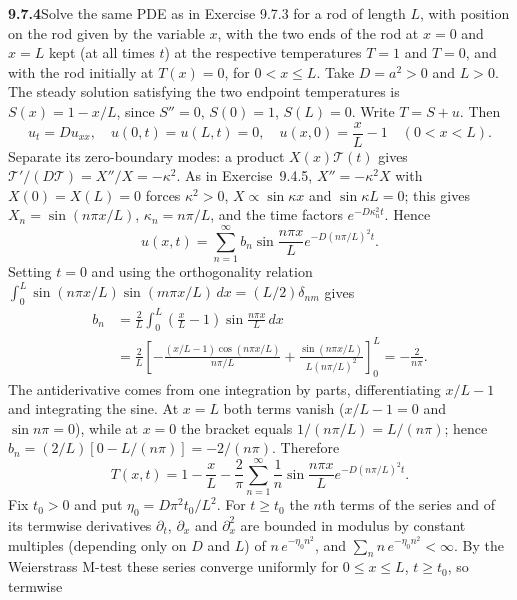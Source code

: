 \par\bigskip
\noindent\textbf{9.7.4}\quad Solve the same PDE as in Exercise 9.7.3 for a rod
of length $L$, 
with position on the rod given by the variable $x$, with the
two ends of the rod at $x=0$ and $x=L$ kept (at all times $t$) at the
respective temperatures $T=1$ and $T=0$, and with the rod initially at
$T(x)=0$, for $0<x\le L$.
\solution
Take $D=a^2>0$ and $L>0$.
The steady solution satisfying the two endpoint temperatures is
$S(x)=1-x/L$, since $S''=0$, $S(0)=1$, $S(L)=0$.
Write $T=S+u$.  Then
\[
u_t=D u_{xx},\quad u(0,t)=u(L,t)=0,\quad
u(x,0)=\frac xL-1\quad(0<x<L).
\]
Separate its zero-boundary modes: a product $X(x)\mathcal T(t)$ gives
$\mathcal T'/(D\mathcal T)=X''/X=-\kappa^2$.  As in Exercise~9.4.5,
$X''=-\kappa^2X$ with $X(0)=X(L)=0$ forces $\kappa^2>0$,
$X\propto\sin\kappa x$ and $\sin\kappa L=0$; this gives
$X_n=\sin(n\pi x/L)$, $\kappa_n=n\pi/L$, and the time factors
$e^{-D\kappa_n^2t}$.
Hence
\[
u(x,t)=\sum_{n=1}^{\infty}b_n\sin\frac{n\pi x}{L}
 e^{-D(n\pi/L)^2t}.
\]
Setting $t=0$ and using the orthogonality relation
$\int_0^L\sin(n\pi x/L)\sin(m\pi x/L)\,dx=(L/2)\delta_{nm}$ gives
\begin{align*}
b_n&=\frac2L\int_0^L\left(\frac xL-1\right)
                  \sin\frac{n\pi x}L\,dx\\
&=\frac2L\left[
 -\frac{(x/L-1)\cos(n\pi x/L)}{n\pi/L}
 +\frac{\sin(n\pi x/L)}{L(n\pi/L)^2}\right]_0^L
=-\frac2{n\pi}.
\end{align*}
The antiderivative comes from one integration by parts, differentiating
$x/L-1$ and integrating the sine.  At $x=L$ both terms vanish
($x/L-1=0$ and $\sin n\pi=0$), while at $x=0$ the bracket equals
$1/(n\pi/L)=L/(n\pi)$; hence $b_n=(2/L)[0-L/(n\pi)]=-2/(n\pi)$.
Therefore
\[
\boxed{T(x,t)=1-\frac xL-\frac2\pi
\sum_{n=1}^{\infty}\frac1n\sin\frac{n\pi x}L
 e^{-D(n\pi/L)^2t}}.
\]
Fix $t_0>0$ and put $\eta_0=D\pi^2t_0/L^2$.  For $t\ge t_0$ the $n$th
terms of the series and of its termwise derivatives $\partial_t$,
$\partial_x$ and $\partial_x^2$ are bounded in modulus by constant
multiples (depending only on $D$ and $L$) of $n\,e^{-\eta_0n^2}$, and
$\sum_nn\,e^{-\eta_0n^2}<\infty$.  By the Weierstrass M-test these
series converge uniformly for $0\le x\le L$, $t\ge t_0$, so termwise
